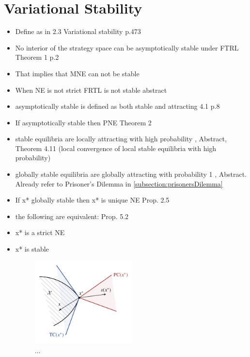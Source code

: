 \section{Variational Stability}\label{section:variationalStability}

\begin{itemize}
    \item Define as in \cite{mertikopoulos} 2.3 Variational stability p.473
    \item No interior of the strategy space can be asymptotically stable under FTRL \cite{flokas} Theorem 1 p.2
    \item That implies that MNE can not be stable
    \item When NE is not strict FRTL is not stable \cite{flokas} abstract
    \item asymptotically stable is defined as both stable and attracting \cite{flokas} 4.1 p.8
    \item If asymptotically stable then PNE \cite{flokas} Theorem 2
    
    \item stable equilibria are locally attracting with high probability \cite{mertikopoulos}, Abstract, Theorem 4.11 (local convergence of local stable equilibria with high probability) 
    \item globally stable equilibria are globally attracting with probability 1 \cite{mertikopoulos}, Abstract. Already refer to Prisoner's Dilemma in \ref{subsection:prisonersDilemma}
    \item If x* globally stable then x* is unique NE \cite{mertikopoulos} Prop. 2.5 
    \item the following are equivalent: \cite{mertikopoulos} Prop. 5.2
    \item x* is a strict NE
    \item x* is stable
    
    
    \begin{figure}
    \centering
    \includegraphics[width=0.5\textwidth]{logos/Mertikopoulos-VS.png}
    \caption{...}
    \label{Mertikopoulos-VS}
    \end{figure}

\end{itemize}

